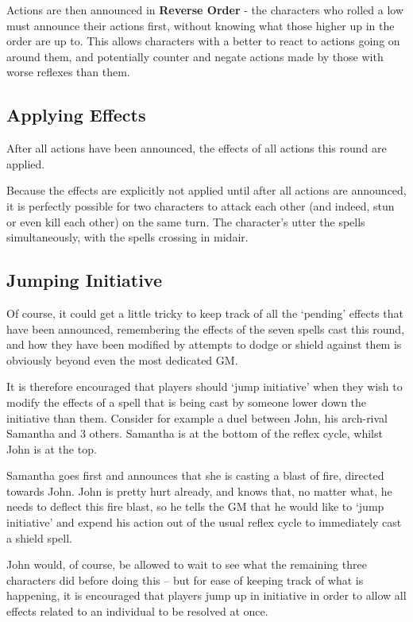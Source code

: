 Actions are then announced in {\bf Reverse Order} - the characters who rolled a low  must announce their actions first, without knowing what those higher up in the order are up to. This allows characters with a better  to react to actions going on around them, and potentially counter and negate actions made by those with worse reflexes than them.  

\subsection{Applying Effects}

After all actions have been announced, the effects of all actions this round are applied. 

Because the effects are explicitly not applied until after all actions are announced, it is perfectly possible for two characters to attack each other (and indeed, stun or even kill each other) on the same turn. The character's utter the spells simultaneously, with the spells crossing in midair.

\subsection{Jumping Initiative} 

Of course, it could get a little tricky to keep track of all the `pending' effects that have been announced, remembering the effects of the seven spells cast this round, and how they have been modified by attempts to dodge or shield against them is obviously beyond even the most dedicated GM. 

It is therefore encouraged that players should `jump initiative' when they wish to modify the effects of a spell that is being cast by someone lower down the initiative than them. Consider for example a duel between John, his arch-rival Samantha and 3 others. Samantha is at the bottom of the reflex cycle, whilst John is at the top. 

Samantha goes first and announces that she is casting a \levelThree{} blast of fire, directed towards John. John is pretty hurt already, and knows that, no matter what, he needs to deflect this fire blast, so he tells the GM that he would like to `jump initiative' and expend his action out of the usual reflex cycle to immediately cast a \levelTwo{} shield spell. 

John would, of course, be allowed to wait to see what the remaining three characters did before doing this -- but for ease of keeping track of what is happening, it is encouraged that players jump up in initiative in order to allow all effects related to an individual to be resolved at once. 

